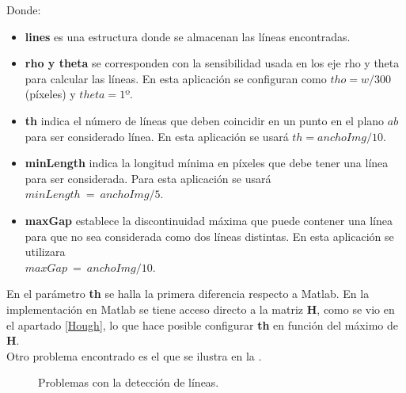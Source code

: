 Donde:
\begin{itemize}
\item \textbf{lines} es una estructura donde se almacenan las líneas encontradas.

\item \textbf{rho y theta} se corresponden con la sensibilidad usada en los eje rho y theta para calcular las líneas. En esta aplicación se configuran como $tho=w/300$ (píxeles) y $ theta=1º$.

\item\textbf {th} indica el número de líneas que deben coincidir en un punto en el plano $ab$ para ser considerado línea. En esta aplicación se usará $th = anchoImg/10$.

\item\textbf{minLength} indica la longitud mínima en píxeles que debe tener una línea para ser considerada. Para esta aplicación se usará $minLength~=~anchoImg/5$.

\item\textbf{maxGap} establece la discontinuidad máxima que puede contener una línea para que no sea considerada como dos líneas distintas. En esta aplicación se utilizara\\ $maxGap~=~anchoImg/10$.
\end{itemize}

En el parámetro \textbf {th} se halla la primera diferencia respecto a Matlab. En la implementación en Matlab se tiene acceso directo a la matriz \textbf{H}, como se vio en el apartado \ref{Hough}, lo que hace posible configurar \textbf {th} en función del máximo de \textbf{H}.\\

Otro problema encontrado es el que se ilustra en la .\\

\begin{figure}[!h]
\centering {}
\caption{\small{Problemas con la detección de líneas.}} \label{ProblemaLineasOpenCV}
\end{figure}


